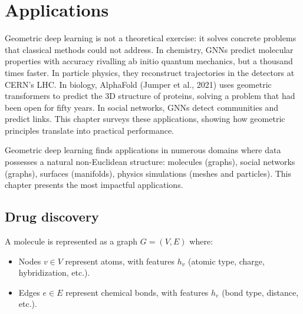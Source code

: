 \chapter{Applications}
\label{ch:applications}

Geometric deep learning is not a theoretical exercise: it solves concrete problems that classical methods could not address. In chemistry, GNNs predict molecular properties with accuracy rivalling ab initio quantum mechanics, but a thousand times faster. In particle physics, they reconstruct trajectories in the detectors at CERN's LHC. In biology, AlphaFold (Jumper et al., 2021) uses geometric transformers to predict the 3D structure of proteins, solving a problem that had been open for fifty years. In social networks, GNNs detect communities and predict links. This chapter surveys these applications, showing how geometric principles translate into practical performance.

\begin{intuition}
Geometric deep learning finds applications in numerous domains where
data possesses a natural non-Euclidean structure: molecules (graphs),
social networks (graphs), surfaces (manifolds), physics simulations
(meshes and particles). This chapter presents the most impactful
applications.
\end{intuition}

\section{Drug discovery}
\label{sec:drug_discovery}

\begin{definition}
A molecule is represented as a graph $G = (V, E)$ where:
\begin{itemize}
  \item Nodes $v \in V$ represent atoms, with features $h_v$
        (atomic type, charge, hybridization, etc.).
  \item Edges $e \in E$ represent chemical bonds, with features
        $h_e$ (bond type, distance, etc.).
\end{itemize}
\end{definition}

